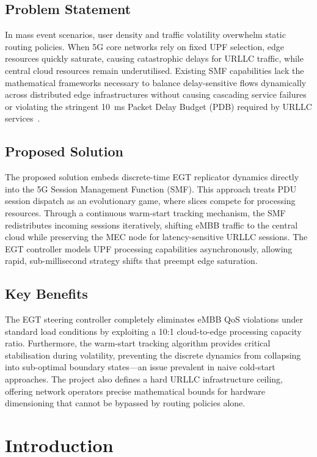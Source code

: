\documentclass[11pt,a4paper,english]{article}
\begin{document}
\subsection{Problem Statement}
In mass event scenarios, user density and traffic volatility overwhelm static routing policies. When 5G core networks rely on fixed UPF selection, edge resources quickly saturate, causing catastrophic delays for URLLC traffic, while central cloud resources remain underutilised. Existing SMF capabilities lack the mathematical frameworks necessary to balance delay-sensitive flows dynamically across distributed edge infrastructures without causing cascading service failures or violating the stringent 10~ms Packet Delay Budget (PDB) required by URLLC services~\cite{3gpp_ts23501, 3gpp_ts22261}.

\subsection{Proposed Solution}
The proposed solution embeds discrete-time EGT replicator dynamics directly into the 5G Session Management Function (SMF). This approach treats PDU session dispatch as an evolutionary game, where slices compete for processing resources. Through a continuous warm-start tracking mechanism, the SMF redistributes incoming sessions iteratively, shifting eMBB traffic to the central cloud while preserving the MEC node for latency-sensitive URLLC sessions. The EGT controller models UPF processing capabilities asynchronously, allowing rapid, sub-millisecond strategy shifts that preempt edge saturation.

\subsection{Key Benefits}
The EGT steering controller completely eliminates eMBB QoS violations under standard load conditions by exploiting a 10:1 cloud-to-edge processing capacity ratio. Furthermore, the warm-start tracking algorithm provides critical stabilisation during volatility, preventing the discrete dynamics from collapsing into sub-optimal boundary states—an issue prevalent in naive cold-start approaches. The project also defines a hard URLLC infrastructure ceiling, offering network operators precise mathematical bounds for hardware dimensioning that cannot be bypassed by routing policies alone.

\section{Introduction}
\end{document}
